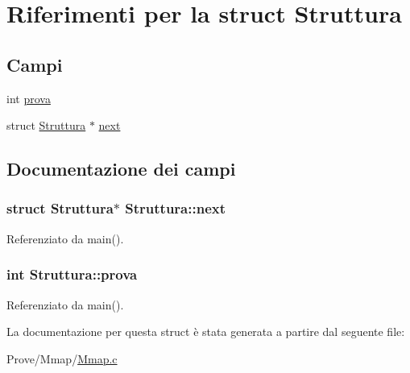 \hypertarget{structStruttura}{\section{Riferimenti per la struct Struttura}
\label{structStruttura}
}
\subsection*{Campi}
\begin{DoxyCompactItemize}
\item 
int \hyperlink{structStruttura_a6bed68a71bad8da4f22e93def9c759af}{prova}
\item 
struct \hyperlink{structStruttura}{Struttura} $\ast$ \hyperlink{structStruttura_a2694fc2200e10bf8dcdc32bf7d8b9642}{next}
\end{DoxyCompactItemize}


\subsection{Documentazione dei campi}
\hypertarget{structStruttura_a2694fc2200e10bf8dcdc32bf7d8b9642}{
\subsubsection[{next}]{\setlength{\rightskip}{0pt plus 5cm}struct {\bf Struttura}$\ast$ Struttura\+::next}}\label{structStruttura_a2694fc2200e10bf8dcdc32bf7d8b9642}


Referenziato da main().

\hypertarget{structStruttura_a6bed68a71bad8da4f22e93def9c759af}{
\subsubsection[{prova}]{\setlength{\rightskip}{0pt plus 5cm}int Struttura\+::prova}}\label{structStruttura_a6bed68a71bad8da4f22e93def9c759af}


Referenziato da main().



La documentazione per questa struct è stata generata a partire dal seguente file\+:\begin{DoxyCompactItemize}
\item 
Prove/\+Mmap/\hyperlink{Mmap_8c}{Mmap.\+c}\end{DoxyCompactItemize}
